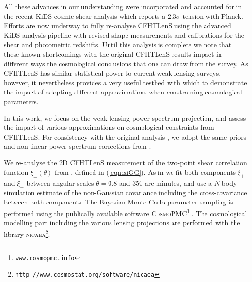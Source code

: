 %
All these advances in our understanding were incorporated and accounted for in
the recent KiDS cosmic shear analysis \citep{KiDS-450} which reports a $2.3
\sigma$ tension with Planck.  Efforts are now underway to fully re-analyse
CFHTLenS using the advanced KiDS analysis pipeline with revised shape
measurements and calibrations for the shear and photometric redshifts. Until
this analysis is complete we note that these known shortcomings with the
original CFHTLenS results impact in different ways the cosmological conclusions
that one can draw from the survey. As CFHTLenS has similar statistical power
to current weak lensing surveys, however, it nevertheless provides a very
useful testbed with which to demonstrate the impact of adopting different
approximations when constraining cosmological parameters.


In this work, we focus on the weak-lensing power spectrum projection, and
assess the impact of various approximations on cosmological constraints from
CFHTLenS. For consistency with the original analysis
\citep{CFHTLenS-2pt-notomo}, we adopt the same priors and non-linear power
spectrum corrections from \cite{2003MNRAS.341.1311S}.

We re-analyse the 2D CFHTLenS measurement of the two-point shear correlation
function $\xi_\pm(\theta)$ from \cite{CFHTLenS-2pt-notomo}, defined in
(\ref{eqn:xiGG}). As in \cite{CFHTLenS-2pt-notomo} we fit both components
$\xi_+$ and $\xi_-$ between angular scales $\theta = 0.8$ and $350$ arc
minutes, and use a $N$-body simulation estimate of the non-Gaussian covariance
including the cross-covariance between both components. The Bayesian
Monte-Carlo parameter sampling is performed using the publically available
software \textsc{CosmoPMC}\footnote{\texttt{www.cosmopmc.info}}
\citep{WK09,KWR10}. The cosmological modelling part including the various
lensing projections are performed with the library
\textsc{nicaea}\footnote{\texttt{http://www.cosmostat.org/software/nicaea}}.

\label{ref:cosmo_results}


